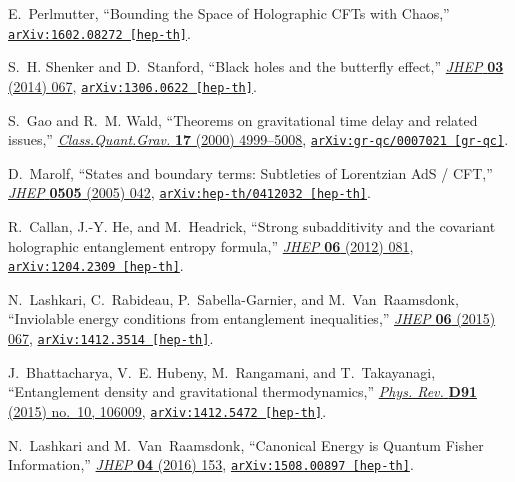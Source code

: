 \begin{thebibliography}{100}
E.~Perlmutter, ``{Bounding the Space of Holographic CFTs with Chaos},''
\href{http://arxiv.org/abs/1602.08272}{{\tt arXiv:1602.08272 [hep-th]}}.

S.~H. Shenker and D.~Stanford, ``{Black holes and the butterfly effect},''
  \href{http://dx.doi.org/10.1007/JHEP03(2014)067}{{\em JHEP} {\bf 03} (2014)
  067},
\href{http://arxiv.org/abs/1306.0622}{{\tt arXiv:1306.0622 [hep-th]}}.

S.~Gao and R.~M. Wald, ``{Theorems on gravitational time delay and related
  issues},'' \href{http://dx.doi.org/10.1088/0264-9381/17/24/305}{{\em
  Class.Quant.Grav.} {\bf 17} (2000)  4999--5008},
\href{http://arxiv.org/abs/gr-qc/0007021}{{\tt arXiv:gr-qc/0007021 [gr-qc]}}.

D.~Marolf, ``{States and boundary terms: Subtleties of Lorentzian AdS / CFT},''
  \href{http://dx.doi.org/10.1088/1126-6708/2005/05/042}{{\em JHEP} {\bf 0505}
  (2005)  042},
\href{http://arxiv.org/abs/hep-th/0412032}{{\tt arXiv:hep-th/0412032
  [hep-th]}}.

R.~Callan, J.-Y. He, and M.~Headrick, ``{Strong subadditivity and the covariant
  holographic entanglement entropy formula},''
  \href{http://dx.doi.org/10.1007/JHEP06(2012)081}{{\em JHEP} {\bf 06} (2012)
  081},
\href{http://arxiv.org/abs/1204.2309}{{\tt arXiv:1204.2309 [hep-th]}}.

N.~Lashkari, C.~Rabideau, P.~Sabella-Garnier, and M.~Van~Raamsdonk,
  ``{Inviolable energy conditions from entanglement inequalities},''
  \href{http://dx.doi.org/10.1007/JHEP06(2015)067}{{\em JHEP} {\bf 06} (2015)
  067},
\href{http://arxiv.org/abs/1412.3514}{{\tt arXiv:1412.3514 [hep-th]}}.

J.~Bhattacharya, V.~E. Hubeny, M.~Rangamani, and T.~Takayanagi, ``{Entanglement
  density and gravitational thermodynamics},''
  \href{http://dx.doi.org/10.1103/PhysRevD.91.106009}{{\em Phys. Rev.} {\bf
  D91} (2015) no.~10, 106009},
\href{http://arxiv.org/abs/1412.5472}{{\tt arXiv:1412.5472 [hep-th]}}.

N.~Lashkari and M.~Van~Raamsdonk, ``{Canonical Energy is Quantum Fisher
  Information},'' \href{http://dx.doi.org/10.1007/JHEP04(2016)153}{{\em JHEP}
  {\bf 04} (2016)  153},
\href{http://arxiv.org/abs/1508.00897}{{\tt arXiv:1508.00897 [hep-th]}}.


\end{thebibliography}
